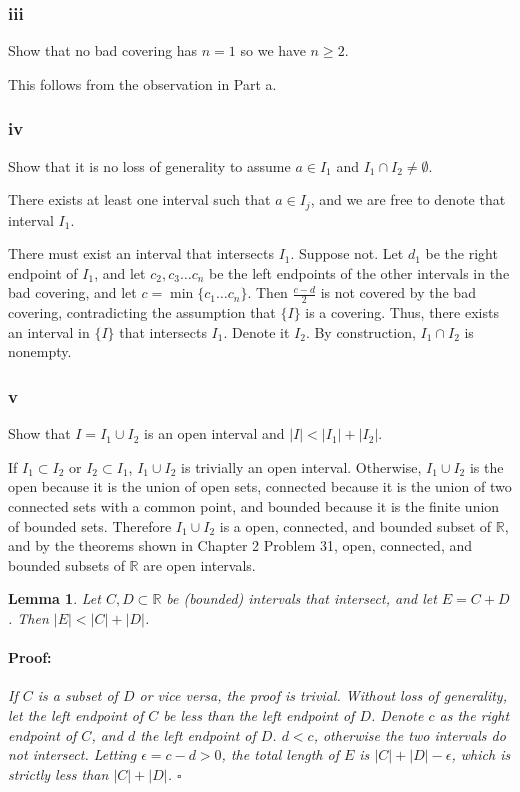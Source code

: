 \documentclass{article}
\newenvironment{proof}{\paragraph{Proof:}}{\hfill$\square$}
\newtheorem{lemma}[theorem]{Lemma}
\newcommand{\R}{\mathbb{R}}
\begin{document}
\subsubsection*{iii}

Show that no bad covering has $n=1$ so we have $n \geq 2$.

This follows from the observation in Part a.

\subsubsection*{iv}

Show that it is no loss of generality to assume $a \in I_1$ and $I_1 \cap I_2 \neq \emptyset$.

There exists at least one interval such that $a \in I_j$, and we are free to denote that interval $I_1$.

There must exist an interval that intersects $I_1$. Suppose not. Let $d_1$ be the right endpoint of $I_1$, and let $c_2, c_3 \dots c_n$ be the left endpoints of the other intervals in the bad covering, and let $c = \min\{c_1 \dots c_n\}$. Then $\frac{c-d}{2}$ is not covered by the bad covering, contradicting the assumption that $\{I\}$ is a covering. Thus, there exists an interval in $\{I\}$ that intersects $I_1$. Denote it $I_2$. By construction, $I_1 \cap I_2$ is nonempty.

\subsubsection*{v}

Show that $I = I_1 \cup I_2$ is an open interval and $|I| < |I_1| + |I_2|$.

If $I_1 \subset I_2$ or $I_2 \subset I_1$, $I_1 \cup I_2$ is trivially an open interval. Otherwise, $I_1 \cup I_2$ is the open because it is the union of open sets, connected because it is the union of two connected sets with a common point, and bounded because it is the finite union of bounded sets. Therefore $I_1 \cup I_2$ is a open, connected, and bounded subset of $\R$, and by the theorems shown in Chapter 2 Problem 31, open, connected, and bounded subsets of $\R$ are open intervals.

\begin{lemma}
Let $C, D \subset \R$ be (bounded) intervals that intersect, and let $E = C + D$. Then $|E| < |C| + |D|$.

\begin{proof}
If $C$ is a subset of $D$ or vice versa, the proof is trivial. Without loss of generality, let the left endpoint of $C$ be less than the left endpoint of $D$. Denote $c$ as the right endpoint of $C$, and $d$ the left endpoint of $D$. $d < c$, otherwise the two intervals do not intersect. Letting $\epsilon = c - d > 0$, the total length of $E$ is $|C| + |D| - \epsilon$, which is strictly less than $|C| + |D|$.
\end{proof}
\end{lemma}
\end{document}
